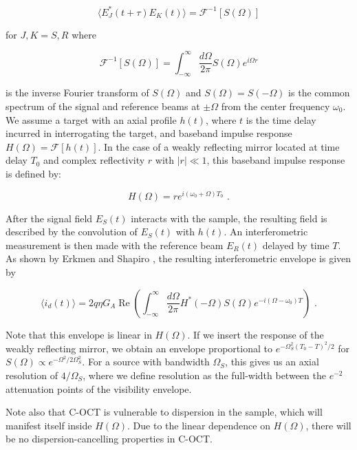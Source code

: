 \begin{equation}
\langle E_J^*(t+\tau) E_K(t) \rangle = \mathcal{F}^{-1}[S(\Omega)]
\end{equation}

for $J, K = S, R$ where

\begin{equation}
\mathcal{F}^{-1}[S(\Omega)] = \int_{-\infty}^{\infty} \frac{d\Omega}{2\pi} S(\Omega) e^{i \Omega r}
\end{equation}

is the inverse Fourier transform of $S(\Omega)$ and $S(\Omega) = S(-\Omega)$ is the common spectrum of the signal and reference beams at $\pm\Omega$ from the center frequency $\omega_0$. We assume a target with an axial profile $h(t)$, where $t$ is the time delay incurred in interrogating the target, and baseband impulse response $H(\Omega) = \mathcal{F}[h(t)]$. In the case of a weakly reflecting mirror located at time delay $T_0$ and complex reflectivity $r$ with $|r| \ll 1$, this baseband impulse response is defined by:

\begin{equation}
H(\Omega) = re^{i(\omega_0 + \Omega)T_0}\,\,.
\end{equation}

After the signal field $E_S(t)$ interacts with the sample, the resulting field is described by the convolution of $E_S(t)$ with $h(t)$. An interferometric measurement is then made with the reference beam $E_R(t)$ delayed by time $T$. As shown by Erkmen and Shapiro \cite{erkmen-pcoct}, the resulting interferometric envelope is given by

\begin{equation}
\langle i_d(t) \rangle = 2q\eta G_A \operatorname{Re}\left( \int_{-\infty}^{\infty} \frac{d\Omega}{2\pi} H^*(-\Omega) S(\Omega) e^{-i(\Omega-\omega_0)T}   \right)\,\,.
\end{equation}

Note that this envelope is linear in $H(\Omega)$. If we insert the response of the weakly reflecting mirror, we obtain an envelope proportional to $e^{-\Omega_S^2 (T_0 - T)^2 / 2}$ for $S(\Omega) \propto e^{-\Omega^2/2\Omega_S^2}$. For a source with bandwidth $\Omega_S$, this gives us an axial resolution of $4/\Omega_S$, where we define resolution as the full-width between the $e^{-2}$ attenuation points of the visibility envelope.

Note also that C-OCT is vulnerable to dispersion in the sample, which will manifest itself inside $H(\Omega)$. Due to the linear dependence on $H(\Omega)$, there will be no dispersion-cancelling properties in C-OCT.

